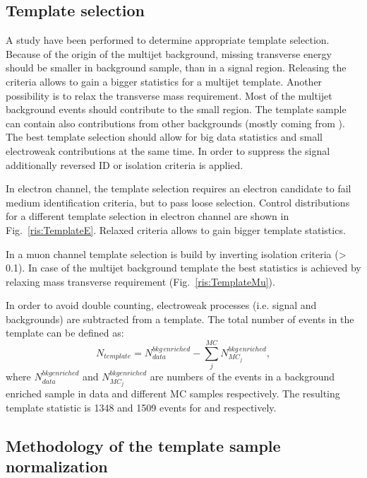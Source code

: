 \subsection{Template selection}

A study have been performed to determine appropriate template selection. Because of the origin of the multijet background, missing transverse energy \etmiss should be smaller in background sample, than in a signal region. Releasing the \etmiss criteria allows to gain a bigger statistics for a multijet template. Another possibility is to relax the transverse mass \mtw requirement. Most of the multijet background events should contribute to the small \mtw region. The template sample can contain also contributions from other backgrounds (mostly coming from \wlnu). The best template selection should allow for big data statistics and small electroweak contributions at the same time. In order to suppress the signal additionally reversed ID or isolation criteria is applied. 

In electron channel, the template selection requires an electron candidate to fail medium identification criteria, but to pass loose selection. Control distributions for a different template selection in electron channel are shown in Fig.~\ref{ris:TemplateE}. Relaxed \etmiss criteria allows to gain bigger template statistics. 

In a muon channel template selection is build by inverting isolation criteria (\ptcone > 0.1). In case of \wmunu the multijet background template the best statistics is achieved by relaxing mass transverse \mtw requirement (Fig.~\ref{ris:TemplateMu}). 

In order to avoid double counting, electroweak processes (i.e. signal and backgrounds) are subtracted from a template. The total number of events in the template can be defined as:
\begin{equation}
N_{template} = N^{bkg\, enriched}_{data} - \sum_{j}^{MC} N_{MC_j}^{bkg\, enriched},
\end{equation}
where $N^{bkg enriched}_{data}$ and $N_{MC_j}^{bkg enriched}$ are numbers of the events in a background enriched sample in data and different MC samples respectively. The resulting template statistic is 1348 and 1509 events for \wenu and \wmunu respectively. 


\subsection{Methodology of the template sample normalization}

